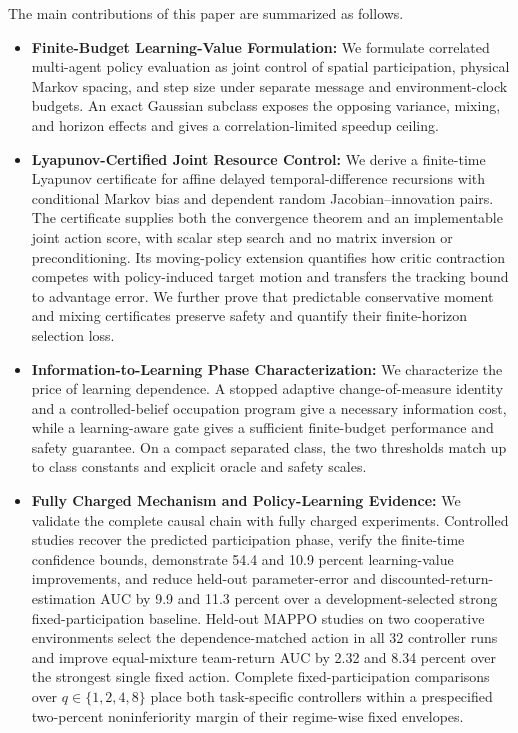 \documentclass[journal]{IEEEtran}
\begin{document}
The main contributions of this paper are summarized as follows.
\begin{itemize}
\item \textbf{Finite-Budget Learning-Value Formulation:} We formulate correlated multi-agent policy evaluation as joint control of spatial participation, physical Markov spacing, and step size under separate message and environment-clock budgets.
An exact Gaussian subclass exposes the opposing variance, mixing, and horizon effects and gives a correlation-limited speedup ceiling.
\item \textbf{Lyapunov-Certified Joint Resource Control:} We derive a finite-time Lyapunov certificate for affine delayed temporal-difference recursions with conditional Markov bias and dependent random Jacobian--innovation pairs.
The certificate supplies both the convergence theorem and an implementable joint action score, with scalar step search and no matrix inversion or preconditioning.
Its moving-policy extension quantifies how critic contraction competes with policy-induced target motion and transfers the tracking bound to advantage error.
We further prove that predictable conservative moment and mixing certificates preserve safety and quantify their finite-horizon selection loss.
\item \textbf{Information-to-Learning Phase Characterization:} We characterize the price of learning dependence.
A stopped adaptive change-of-measure identity and a controlled-belief occupation program give a necessary information cost, while a learning-aware gate gives a sufficient finite-budget performance and safety guarantee.
On a compact separated class, the two thresholds match up to class constants and explicit oracle and safety scales.
\item \textbf{Fully Charged Mechanism and Policy-Learning Evidence:} We validate the complete causal chain with fully charged experiments.
Controlled studies recover the predicted participation phase, verify the finite-time confidence bounds, demonstrate 54.4 and 10.9 percent learning-value improvements, and reduce held-out parameter-error and discounted-return-estimation AUC by 9.9 and 11.3 percent over a development-selected strong fixed-participation baseline.
Held-out MAPPO studies on two cooperative environments select the dependence-matched action in all 32 controller runs and improve equal-mixture team-return AUC by 2.32 and 8.34 percent over the strongest single fixed action.
Complete fixed-participation comparisons over $q\in\{1,2,4,8\}$ place both task-specific controllers within a prespecified two-percent noninferiority margin of their regime-wise fixed envelopes.
\end{itemize}
\end{document}
